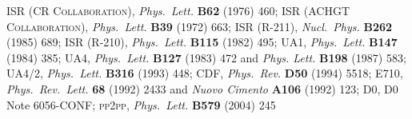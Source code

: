 \documentclass[3p,onecolumn,12pt,times,longtitle]{elsarticle}
\def\etal{et al.}
\def\Name#1{\textsc{#1}, }
\def\REVIEW#1#2#3#4{{\it #1} {\bf #2} (#3) #4}
\begin{document}

	\Name{ISR (CR Collaboration)} \REVIEW{Phys.~Lett.}{B62}{1976}{460}; 
	\Name{ISR (ACHGT Collaboration)} \REVIEW{Phys.~Lett.}{B39}{1972}{663}; 
	\Name{ISR (R-211)} \REVIEW{Nucl.~Phys.}{B262}{1985}{689}; 
	\Name{ISR (R-210)} \REVIEW{Phys.~Lett.}{B115}{1982}{495}; 
	\Name{UA1} \REVIEW{Phys.~Lett.}{B147}{1984}{385}; 
	\Name{UA4} \REVIEW{Phys.~Lett.}{B127}{1983}{472} and \REVIEW{Phys. Lett.}{B198}{1987}{583}; 
	\Name{UA4/2} \REVIEW{Phys.~Lett.}{B316}{1993}{448}; 
	\Name{CDF} \REVIEW{Phys.~Rev.}{D50}{1994}{5518}; 
	\Name{E710} \REVIEW{Phys.~Rev.~Lett.}{68}{1992}{2433} and \REVIEW{Nuovo Cimento}{A106}{1992}{123}; 
	\Name{D0} D0 Note 6056-CONF; 
	\Name{pp2pp} \REVIEW{Phys.~Lett.}{B579}{2004}{245}

\fi
\end{document}
